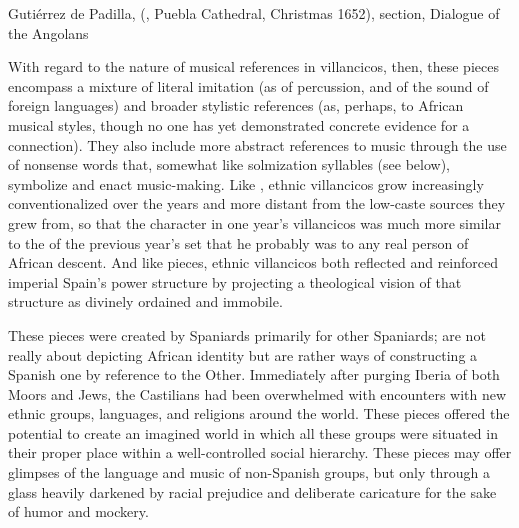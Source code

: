 {Gutiérrez de Padilla,  
(, Puebla Cathedral, Christmas 1652), 
section, Dialogue of the Angolans}

With regard to the nature of musical references in 
villancicos, then, these pieces encompass a mixture of literal imitation (as of
percussion, and of the  sound of foreign languages) and
broader stylistic references (as, perhaps, to African musical styles, though no
one has yet demonstrated concrete evidence for a connection).
They also include more abstract references to music through the use of nonsense
words that, somewhat like solmization syllables (see below), symbolize and
enact music-making.
Like , ethnic villancicos grow increasingly conventionalized over
the years and more distant from the low-caste sources they grew from, so that
the  character in one year's villancicos was much more similar to
the  of the previous year's set that he probably was to any real
person of African descent.
And like  pieces, ethnic villancicos both reflected and reinforced
imperial Spain's power structure by projecting a theological vision of that
structure as divinely ordained and immobile.

These pieces were created by Spaniards primarily for other Spaniards;
 are not really about depicting African identity but
are rather ways of constructing a Spanish one by reference to the Other.
Immediately after purging Iberia of both Moors and Jews, the Castilians had
been overwhelmed with encounters with new ethnic groups, languages, and
religions around the world. 
These pieces offered the potential to create an imagined world in which all
these groups were situated in their proper place within a well-controlled
social hierarchy.
These pieces may offer glimpses of the language and music of non-Spanish
groups, but only through a glass heavily darkened by racial prejudice and
deliberate caricature for the sake of humor and mockery.

